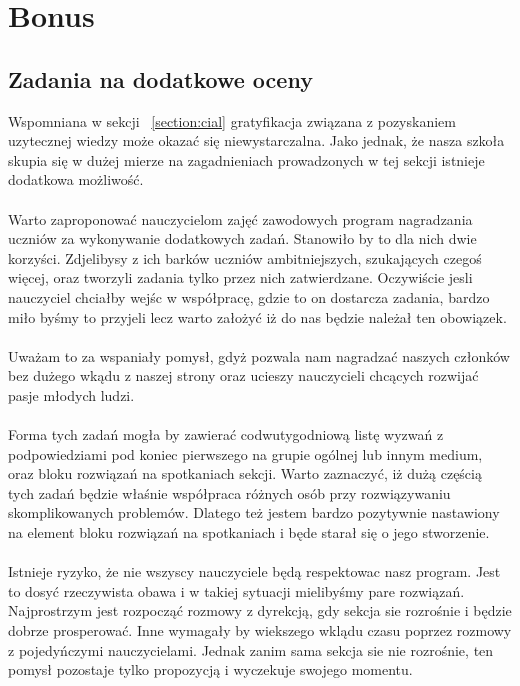 \documentclass[9pt,a4paper]{report}
\begin{document}
\chapter{Bonus}

\section{Zadania na dodatkowe oceny}

Wspomniana w sekcji ~\ref{section:cial} gratyfikacja związana z pozyskaniem uzytecznej wiedzy może okazać się niewystarczalna. Jako jednak, że nasza szkoła skupia się w dużej mierze na zagadnieniach prowadzonych w tej sekcji istnieje dodatkowa możliwość.\\\\
Warto zaproponować nauczycielom zajęć zawodowych program nagradzania uczniów za wykonywanie dodatkowych zadań. Stanowiło by to dla nich dwie korzyści. Zdjelibysy z ich barków uczniów ambitniejszych, szukających czegoś więcej, oraz tworzyli zadania tylko przez nich zatwierdzane. Oczywiście jesli nauczyciel chciałby wejśc w współpracę, gdzie to on dostarcza zadania, bardzo miło byśmy to przyjeli lecz warto założyć iż do nas będzie należał ten obowiązek.\\\\
Uważam to za wspaniały pomysł, gdyż pozwala nam nagradzać naszych członków bez dużego wkądu z naszej strony oraz ucieszy nauczycieli chcących rozwijać pasje młodych ludzi.\\\\
Forma tych zadań mogła by zawierać codwutygodniową listę wyzwań z podpowiedziami pod koniec pierwszego na grupie ogólnej lub innym medium, oraz bloku rozwiązań na spotkaniach sekcji. Warto zaznaczyć, iż dużą częścią tych zadań będzie właśnie współpraca różnych osób przy rozwiązywaniu skomplikowanych problemów. Dlatego też jestem bardzo pozytywnie nastawiony na element bloku rozwiązań na spotkaniach i będe starał się o jego stworzenie.\\\\
Istnieje ryzyko, że nie wszyscy nauczyciele będą respektowac nasz program. Jest to dosyć rzeczywista obawa i w takiej sytuacji mielibyśmy pare rozwiązań. Najprostrzym jest rozpocząć rozmowy z dyrekcją, gdy sekcja sie rozrośnie i będzie dobrze prosperować. Inne wymagały by wiekszego wklądu czasu poprzez rozmowy z pojedyńczymi nauczycielami. Jednak zanim sama sekcja sie nie rozrośnie, ten pomysł pozostaje tylko propozycją i wyczekuje swojego momentu.
\end{document}
